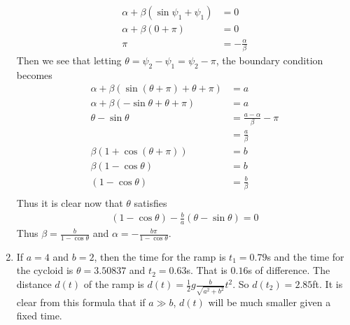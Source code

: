 \documentclass[12pt]{article}
\begin{document}
\begin{problem}[4]
\begin{enumerate}[label=(\roman*)]
	\begin{align*}
		\alpha + \beta(\sin \psi_1 + \psi_1) &= 0 \\
		\alpha+ \beta(0+ \pi) &= 0 \\
		\pi &= - \frac{ \alpha}{ \beta}
	\end{align*}
	Then we see that letting $ \theta = \psi_2- \psi_1= \psi_2 - \pi$, the boundary condition becomes
	\begin{align*}
		\alpha + \beta(\sin (\theta+\pi)+ \theta + \pi) &= a \\
		\alpha + \beta(-\sin \theta + \theta + \pi) &= a \\
		\theta - \sin \theta &= \frac{a- \alpha}{ \beta} - \pi  \\
		&= \frac{a}{ \beta} \\
		\beta (1+ \cos (\theta+\pi)) &= b \\
		\beta(1-\cos \theta) &= b\\ 
		(1-\cos \theta) &= \frac{b}{\beta} \\
	\end{align*}
	Thus it is clear now that $ \theta$ satisfies
	\begin{align*}
		(1-\cos \theta) - \frac{b}{a} (\theta - \sin \theta) =0
	\end{align*}
	Thus $ \beta = \frac{b}{1-\cos \theta}$ and $ \alpha = - \frac{b\pi}{ 1- \cos \theta}$.
\item If $ a = 4$ and  $ b=2$, then the time for the ramp is $ t_1 = 0.79$s and the time for the cycloid is $ \theta = 3.50837$ and $ t_2 = 0.63$s. That is $ 0.16$s of difference. The distance $ d(t)$ of the ramp is $ d(t) = \frac{1}{2} g \frac{b}{ \sqrt{a^2+b^2} } t^2$. So $ d(t_2) = 2.85$ft. It is clear from this formula that if $ a \gg b$,  $ d(t)$ will be much smaller given a fixed time. 
\end{enumerate}
\end{problem}
\end{document}
